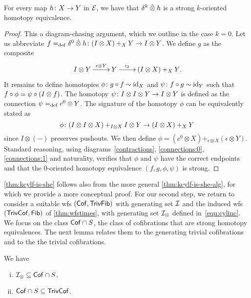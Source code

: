 \documentclass[reqno,10pt,a4paper,oneside,draft]{amsart}
\begin{document}
{{\begin{lemma} \label{thm:kcylf-is-she}
For every map $h \co X \to Y$ in $\cal{E}$, we have that $\kcyl \hatotimes h$ is a strong $k$-oriented homotopy equivalence.
\end{lemma}

\begin{proof} This a diagram-chasing argument, which we outline in the case $k = 0$.
Let us abbreviate $f \defeq \delta^0 \hatotimes h \co (I \otimes X) +_X Y \to I \otimes Y$.
We define $g$ as the composite
\[
\xymatrix{
  I \otimes Y
  \ar[r]^-{\epsilon \otimes Y}
&
  Y
  \ar[r]^-{\iota_2}
&
  (I \otimes X) +_X Y
\rlap{.}}
\]
It remains to define homotopies $\phi \co g \cc f \sim \id_X$ and $\psi \co f \cc g \sim \id_Y$ such that $f \cc \phi = \psi \cc (I \otimes f)$.
The homotopy $\psi \co I \otimes I \otimes Y \to I \otimes Y$ is defined as the connection $\psi \defeq c^0 \otimes Y$.
The signature of the homotopy $\phi$ can be equivalently stated as
\[
\phi \co (I \otimes I \otimes X) +_{I \otimes X} I \otimes Y \to (I \otimes X) +_X Y
\]
since $I \otimes (-)$ preserves pushouts.
We then define $\phi = (c^0 \otimes X) +_{\epsilon \otimes X} (\epsilon \otimes Y)$.
Standard reasoning,  using diagrams~\eqref{contractions}, \eqref{connections:0}, \eqref{connections:1} and naturality, verifies that $\phi$ and $\psi$ have the correct endpoints and that the $0$-oriented homotopy equivalence $(f, g, \phi, \psi)$ is strong.
%
%
\end{proof}

\cref{thm:kcylf-is-she} follows also from the more general \cref{thm:kcylf-is-she-alg}, for which we provide a more conceptual
proof. For our second step, we return to consider a suitable wfs $(\Cof, \TrivFib)$ with generating set $\cal{I}$ and the induced wfs $(\TrivCof, \Fib)$ of \cref{thm:wfstimes}, with generating set $\cal{I}_\otimes$ defined in~\eqref{equ:cylinc}. 
We focus on the class $\Cof \cap S$, \ie the class of cofibrations that are strong homotopy equivalences.
The next lemma relates them to the generating trivial cofibrations and to the the trivial
cofibrations. 


\begin{lemma} \label{thm:main-sheretract}  We have
\begin{enumerate}[(i)]
\item $\cal{I}_\otimes \subseteq \Cof \cap S$,
\item $\Cof \cap S \subseteq \TrivCof$.
\end{enumerate}
\end{lemma}

}}
\end{document}
